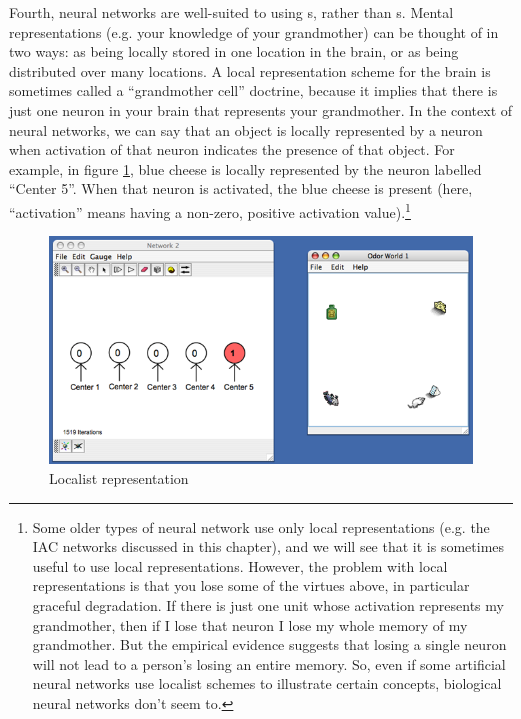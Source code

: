 Fourth, neural networks are well-suited to using s, rather than s. Mental representations (e.g. your knowledge of your grandmother) can be thought of in two ways: as being locally stored in one location in the brain, or as being distributed over many locations. A local representation scheme for the brain is sometimes called a ``grandmother cell'' doctrine, because it implies that there is just one neuron in your brain that represents your grandmother. In the context of neural networks, we can say that an object is locally represented by a neuron when activation of that neuron indicates the presence of that object. For example, in figure \ref{localist}, blue cheese is locally represented by the neuron labelled ``Center 5''. When that neuron is activated, the blue cheese is present (here, ``activation'' means having a non-zero, positive activation value).\footnote{Some older types of neural network use only local representations (e.g. the IAC networks discussed in this chapter), and we will see that it is sometimes useful to use local representations. However, the problem with local representations is that you lose some of the virtues above, in particular graceful degradation. If there is just one unit whose activation represents my grandmother, then if I lose that neuron I lose my whole memory of my grandmother. But the empirical evidence suggests that losing a single neuron will not lead to a person's losing an entire memory. So, even if some artificial neural networks use localist schemes to illustrate certain concepts, biological neural networks don't seem to.}

\begin{figure}[h]
\centering
\includegraphics[scale=.3]{./images/Local_Rep.png}
\caption{Localist representation}
\label{localist}
\end{figure}

